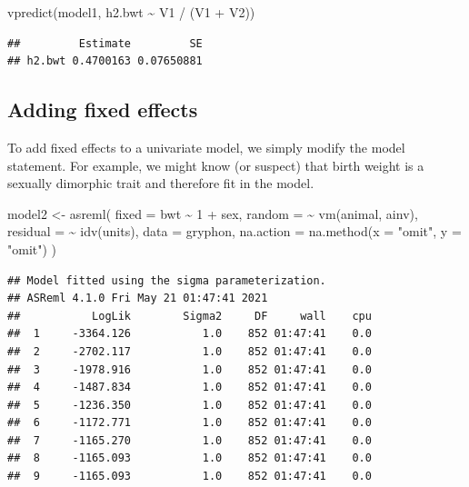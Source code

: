 \documentclass[
  12pt,
]{book}
\newenvironment{Shaded}{\begin{snugshade}}{\end{snugshade}}
\newcommand{\AttributeTok}[1]{\textcolor[rgb]{0.77,0.63,0.00}{#1}}
\newcommand{\DecValTok}[1]{\textcolor[rgb]{0.00,0.00,0.81}{#1}}
\newcommand{\FunctionTok}[1]{\textcolor[rgb]{0.00,0.00,0.00}{#1}}
\newcommand{\NormalTok}[1]{#1}
\newcommand{\OtherTok}[1]{\textcolor[rgb]{0.56,0.35,0.01}{#1}}
\newcommand{\SpecialCharTok}[1]{\textcolor[rgb]{0.00,0.00,0.00}{#1}}
\newcommand{\StringTok}[1]{\textcolor[rgb]{0.31,0.60,0.02}{#1}}
\begin{document}
\begin{Shaded}
\begin{Highlighting}[]
\FunctionTok{vpredict}\NormalTok{(model1, h2.bwt }\SpecialCharTok{\textasciitilde{}}\NormalTok{ V1 }\SpecialCharTok{/}\NormalTok{ (V1 }\SpecialCharTok{+}\NormalTok{ V2))}
\end{Highlighting}
\end{Shaded}

\begin{verbatim}
##         Estimate         SE
## h2.bwt 0.4700163 0.07650881
\end{verbatim}

\hypertarget{adding-fixed-effects}{%
\subsection{Adding fixed effects}\label{adding-fixed-effects}}

To add fixed effects to a univariate model, we simply modify the model statement. For example, we might know (or suspect) that birth weight is a sexually dimorphic trait and therefore fit in the model.

\begin{Shaded}
\begin{Highlighting}[]
\NormalTok{model2 }\OtherTok{\textless{}{-}} \FunctionTok{asreml}\NormalTok{(}
  \AttributeTok{fixed =}\NormalTok{ bwt }\SpecialCharTok{\textasciitilde{}} \DecValTok{1} \SpecialCharTok{+}\NormalTok{ sex,}
  \AttributeTok{random =} \SpecialCharTok{\textasciitilde{}} \FunctionTok{vm}\NormalTok{(animal, ainv),}
  \AttributeTok{residual =} \SpecialCharTok{\textasciitilde{}} \FunctionTok{idv}\NormalTok{(units),}
  \AttributeTok{data =}\NormalTok{ gryphon,}
  \AttributeTok{na.action =} \FunctionTok{na.method}\NormalTok{(}\AttributeTok{x =} \StringTok{"omit"}\NormalTok{, }\AttributeTok{y =} \StringTok{"omit"}\NormalTok{)}
\NormalTok{)}
\end{Highlighting}
\end{Shaded}

\begin{verbatim}
## Model fitted using the sigma parameterization.
## ASReml 4.1.0 Fri May 21 01:47:41 2021
##           LogLik        Sigma2     DF     wall    cpu
##  1     -3364.126           1.0    852 01:47:41    0.0
##  2     -2702.117           1.0    852 01:47:41    0.0
##  3     -1978.916           1.0    852 01:47:41    0.0
##  4     -1487.834           1.0    852 01:47:41    0.0
##  5     -1236.350           1.0    852 01:47:41    0.0
##  6     -1172.771           1.0    852 01:47:41    0.0
##  7     -1165.270           1.0    852 01:47:41    0.0
##  8     -1165.093           1.0    852 01:47:41    0.0
##  9     -1165.093           1.0    852 01:47:41    0.0
\end{verbatim}
\end{document}
